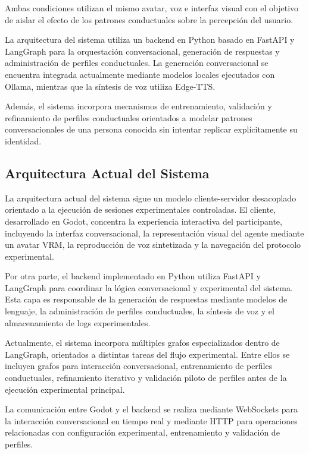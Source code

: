 \documentclass[12pt]{article}
\begin{document}
Ambas condiciones utilizan el mismo avatar, voz e interfaz visual con el objetivo de aislar el efecto de los patrones conductuales sobre la percepción del usuario.

La arquitectura del sistema utiliza un backend en Python basado en FastAPI y LangGraph para la orquestación conversacional, generación de respuestas y administración de perfiles conductuales. La generación conversacional se encuentra integrada actualmente mediante modelos locales ejecutados con Ollama, mientras que la síntesis de voz utiliza Edge-TTS.

Además, el sistema incorpora mecanismos de entrenamiento, validación y refinamiento de perfiles conductuales orientados a modelar patrones conversacionales de una persona conocida sin intentar replicar explícitamente su identidad.

\subsection{Arquitectura Actual del Sistema}

La arquitectura actual del sistema sigue un modelo cliente-servidor desacoplado orientado a la ejecución de sesiones experimentales controladas. El cliente, desarrollado en Godot, concentra la experiencia interactiva del participante, incluyendo la interfaz conversacional, la representación visual del agente mediante un avatar VRM, la reproducción de voz sintetizada y la navegación del protocolo experimental.

Por otra parte, el backend implementado en Python utiliza FastAPI y LangGraph para coordinar la lógica conversacional y experimental del sistema. Esta capa es responsable de la generación de respuestas mediante modelos de lenguaje, la administración de perfiles conductuales, la síntesis de voz y el almacenamiento de logs experimentales.

Actualmente, el sistema incorpora múltiples grafos especializados dentro de LangGraph, orientados a distintas tareas del flujo experimental. Entre ellos se incluyen grafos para interacción conversacional, entrenamiento de perfiles conductuales, refinamiento iterativo y validación piloto de perfiles antes de la ejecución experimental principal.

La comunicación entre Godot y el backend se realiza mediante WebSockets para la interacción conversacional en tiempo real y mediante HTTP para operaciones relacionadas con configuración experimental, entrenamiento y validación de perfiles.
\end{document}
